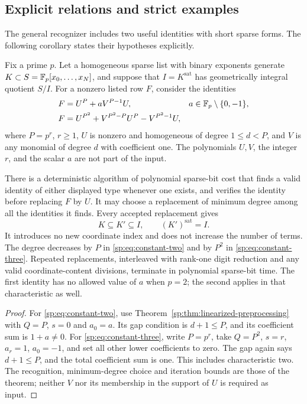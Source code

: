 \subsection{Explicit relations and strict examples}
The general recognizer includes two useful identities with short sparse
forms. The following corollary states their hypotheses explicitly.

\begin{corollary}
\label{sp:thm:constant-field-preprocessing}
Fix a prime $p$. Let a homogeneous sparse list with binary exponents
generate $K\subset S=\mathbb F_p[x_0,\ldots,x_N]$, and suppose that
$I=K^{\mathrm{sat}}$ has geometrically integral quotient $S/I$.
For a nonzero listed row $F$, consider the identities
\begin{align}
 F&=U^P+aV^{P-1}U,
       &&a\in\mathbb F_p\setminus\{0,-1\},                 \label{sp:eq:constant-two}\\
 F&=U^{P^2}+V^{P^2-P}U^P-V^{P^2-1}U,              \label{sp:eq:constant-three}
\end{align}
where $P=p^r$, $r\ge1$, $U$ is nonzero and homogeneous of degree
$1\le d<P$, and $V$ is any monomial of degree $d$ with coefficient
one. The polynomials $U,V$, the integer $r$, and the scalar $a$ are
not part of the input.

There is a deterministic algorithm of polynomial sparse-bit cost that
finds a valid identity of either displayed type whenever one exists,
and verifies the identity before replacing $F$ by $U$. It may choose
a replacement of minimum degree among all the identities it finds.
Every accepted replacement gives
\[
 K\subseteq K'\subseteq I,\qquad (K')^{\mathrm{sat}}=I.
\]
It introduces no new coordinate index and does not increase the number
of terms. The degree decreases by $P$ in
\eqref{sp:eq:constant-two} and by $P^2$ in
\eqref{sp:eq:constant-three}. Repeated replacements, interleaved with
rank-one digit reduction and any valid coordinate-content divisions,
terminate in polynomial sparse-bit time. The first identity has no
allowed value of $a$ when $p=2$; the second applies in that
characteristic as well.
\end{corollary}
\begin{proof}
For \eqref{sp:eq:constant-two}, use
Theorem~\ref{sp:thm:linearized-preprocessing} with $Q=P$, $s=0$
and $a_0=a$. Its gap condition is $d+1\le P$, and its coefficient
sum is $1+a\ne0$. For \eqref{sp:eq:constant-three}, write $P=p^r$,
take $Q=P^2$, $s=r$, $a_r=1$, $a_0=-1$, and set all other lower
coefficients to zero. The gap again says $d+1\le P$, and the total
coefficient sum is one. This includes characteristic two.
The recognition, minimum-degree choice and iteration bounds are
those of the theorem; neither $V$ nor its membership in the support
of $U$ is required as input.
\end{proof}

